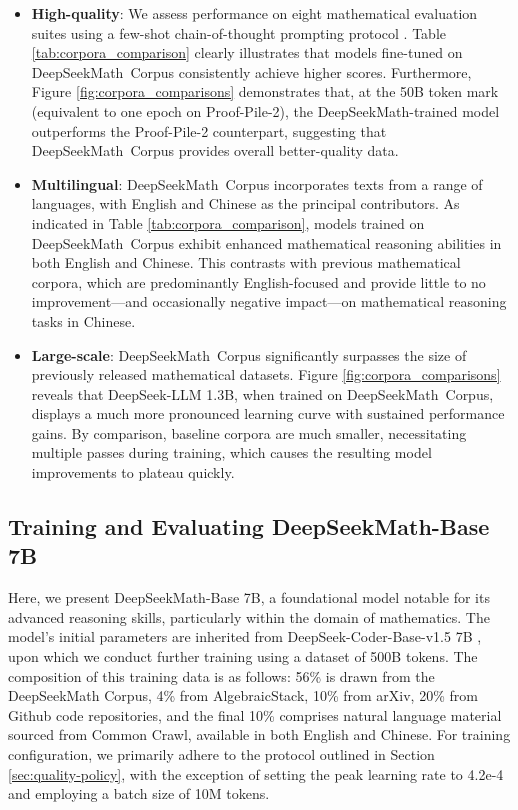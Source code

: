 \begin{itemize}[topsep=0pt]
\begin{itemize}[topsep=0pt]
    \item \textbf{High-quality}:
    We assess performance on eight mathematical evaluation suites using a few-shot chain-of-thought prompting protocol \cite{cot}. Table \ref{tab:corpora_comparison} clearly illustrates that models fine-tuned on DeepSeekMath~Corpus consistently achieve higher scores. Furthermore, Figure \ref{fig:corpora_comparisons} demonstrates that, at the 50B token mark (equivalent to one epoch on Proof-Pile-2), the DeepSeekMath-trained model outperforms the Proof-Pile-2 counterpart, suggesting that DeepSeekMath~Corpus provides overall better-quality data.
    \item \textbf{Multilingual}:
    DeepSeekMath~Corpus incorporates texts from a range of languages, with English and Chinese as the principal contributors. As indicated in Table \ref{tab:corpora_comparison}, models trained on DeepSeekMath~Corpus exhibit enhanced mathematical reasoning abilities in both English and Chinese. This contrasts with previous mathematical corpora, which are predominantly English-focused and provide little to no improvement—and occasionally negative impact—on mathematical reasoning tasks in Chinese.
    \item \textbf{Large-scale}:
    DeepSeekMath~Corpus significantly surpasses the size of previously released mathematical datasets. Figure \ref{fig:corpora_comparisons} reveals that DeepSeek-LLM 1.3B, when trained on DeepSeekMath~Corpus, displays a much more pronounced learning curve with sustained performance gains. By comparison, baseline corpora are much smaller, necessitating multiple passes during training, which causes the resulting model improvements to plateau quickly.
\end{itemize}

\subsection{Training and Evaluating DeepSeekMath-Base 7B}

Here, we present DeepSeekMath-Base 7B, a foundational model notable for its advanced reasoning skills, particularly within the domain of mathematics. The model's initial parameters are inherited from DeepSeek-Coder-Base-v1.5 7B \citep{deepseek-coder}, upon which we conduct further training using a dataset of 500B tokens. The composition of this training data is as follows: 56\% is drawn from the DeepSeekMath Corpus, 4\% from AlgebraicStack, 10\% from arXiv, 20\% from Github code repositories, and the final 10\% comprises natural language material sourced from Common Crawl, available in both English and Chinese. For training configuration, we primarily adhere to the protocol outlined in Section \ref{sec:quality-policy}, with the exception of setting the peak learning rate to 4.2e-4 and employing a batch size of 10M tokens.


\end{itemize}
